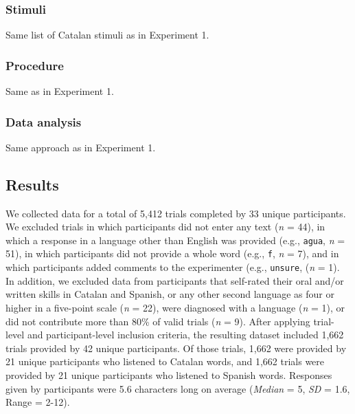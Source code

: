\documentclass[
]{article}
\begin{document}
\subsubsection{Stimuli}\label{stimuli-1}

Same list of Catalan stimuli as in Experiment 1.

\subsubsection{Procedure}\label{procedure-1}

Same as in Experiment 1.

\subsubsection{Data analysis}\label{data-analysis-1}

Same approach as in Experiment 1.

\subsection{Results}\label{results-1}

We collected data for a total of 5,412 trials completed by 33 unique
participants. We excluded trials in which participants did not enter any
text (\emph{n} = 44), in which a response in a language other than
English was provided (e.g., \texttt{agua}, \emph{n} = 51), in which
participants did not provide a whole word (e.g., \texttt{f}, \emph{n} =
7), and in which participants added comments to the experimenter (e.g.,
\texttt{unsure}, (\emph{n} = 1). In addition, we excluded data from
participants that self-rated their oral and/or written skills in Catalan
and Spanish, or any other second language as four or higher in a
five-point scale (\emph{n} = 22), were diagnosed with a language
(\emph{n} = 1), or did not contribute more than 80\% of valid trials
(\emph{n} = 9). After applying trial-level and participant-level
inclusion criteria, the resulting dataset included 1,662 trials provided
by 42 unique participants. Of those trials, 1,662 were provided by 21
unique participants who listened to Catalan words, and 1,662 trials were
provided by 21 unique participants who listened to Spanish words.
Responses given by participants were 5.6 characters long on average
(\emph{Median} = 5, \emph{SD} = 1.6, Range = 2-12).
\end{document}
